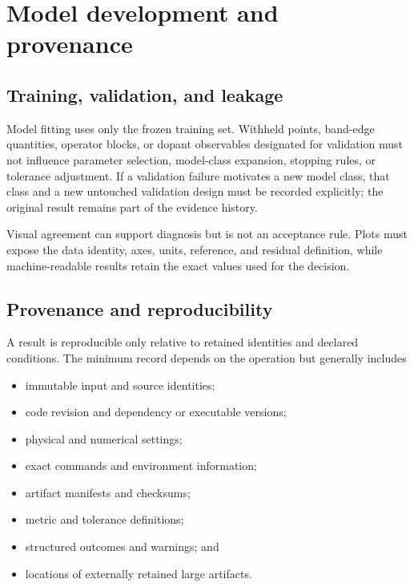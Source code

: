 \section{Model development and provenance}

\subsection{Training, validation, and leakage}


Model fitting uses only the frozen training set. Withheld points, band-edge
quantities, operator blocks, or dopant observables designated for validation
must not influence parameter selection, model-class expansion, stopping rules,
or tolerance adjustment. If a validation failure motivates a new model class,
that class and a new untouched validation design must be recorded explicitly;
the original result remains part of the evidence history.


Visual agreement can support diagnosis but is not an acceptance rule. Plots
must expose the data identity, axes, units, reference, and residual definition,
while machine-readable results retain the exact values used for the decision.

\subsection{Provenance and reproducibility}


A result is reproducible only relative to retained identities and declared
conditions. The minimum record depends on the operation but generally includes

\begin{itemize}
  \item immutable input and source identities;
  \item code revision and dependency or executable versions;
  \item physical and numerical settings;
  \item exact commands and environment information;
  \item artifact manifests and checksums;
  \item metric and tolerance definitions;
  \item structured outcomes and warnings; and
  \item locations of externally retained large artifacts.
\end{itemize}

